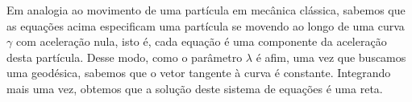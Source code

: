 Em analogia ao movimento de uma partícula em mecânica clássica, sabemos que as equações acima especificam uma partícula se movendo ao longo de uma curva \(\gamma\) com aceleração nula, isto é, cada equação é uma componente da aceleração desta partícula. Desse modo, como o parâmetro \(\lambda\) é afim, uma vez que buscamos uma geodésica, sabemos que o vetor tangente à curva é constante. Integrando mais uma vez, obtemos que a solução deste sistema de equações é uma reta.
